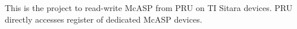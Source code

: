This is the project to read-\/write Mc\-A\-S\-P from P\-R\-U on T\-I Sitara devices. P\-R\-U directly accesses register of dedicated Mc\-A\-S\-P devices. 
